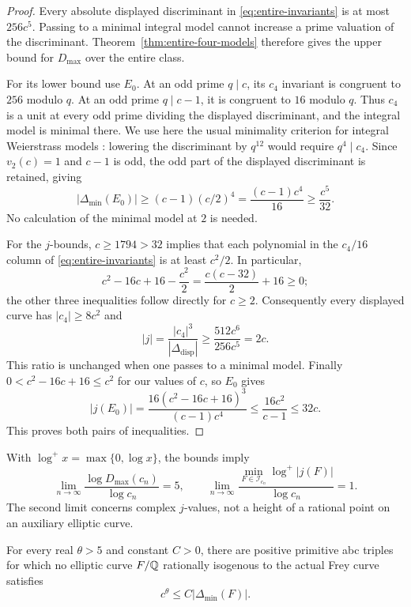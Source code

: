 \begin{proof}
Every absolute displayed discriminant in
\eqref{eq:entire-invariants} is at most $256c^5$. Passing to a minimal
integral model cannot increase a prime valuation of the discriminant.
Theorem~\ref{thm:entire-four-models} therefore gives the upper bound
for $D_{\max}$ over the entire class.

For its lower bound use $E_0$. At an odd prime $q\mid c$, its
$c_4$ invariant is congruent to $256$ modulo $q$. At an odd prime
$q\mid c-1$, it is congruent to $16$ modulo $q$. Thus $c_4$ is a
unit at every odd prime dividing the displayed discriminant, and
the integral model is minimal there. We use here the usual
minimality criterion for integral Weierstrass models
\cite[Chapter~VII]{Silverman}: lowering the discriminant by $q^{12}$
would require $q^4\mid c_4$.
Since $v_2(c)=1$ and $c-1$ is odd, the odd part of the displayed
discriminant is retained, giving
\begin{equation}\label{eq:entire-odd-discriminant}
 |\Delta_{\min}(E_0)|
 \ge(c-1)(c/2)^4
 =\frac{(c-1)c^4}{16}
 \ge\frac{c^5}{32}.
\end{equation}
No calculation of the minimal model at $2$ is needed.

For the $j$-bounds, $c\ge1794>32$ implies that each polynomial in
the $c_4/16$ column of \eqref{eq:entire-invariants} is at least
$c^2/2$. In particular,
\[
 c^2-16c+16-\frac{c^2}{2}
   =\frac{c(c-32)}{2}+16\ge0;
\]
the other three inequalities follow directly for $c\ge2$.
Consequently every displayed curve has $|c_4|\ge8c^2$ and
\[
 |j|=\frac{|c_4|^3}{|\Delta_{\mathrm{disp}}|}
       \ge\frac{512c^6}{256c^5}=2c.
\]
This ratio is unchanged when one passes to a minimal model.
Finally $0<c^2-16c+16\le c^2$ for our values of $c$, so $E_0$ gives
\[
 |j(E_0)|=
 \frac{16(c^2-16c+16)^3}{(c-1)c^4}
 \le\frac{16c^2}{c-1}\le32c.
\]
This proves both pairs of inequalities.
\end{proof}

With $\log^+x=\max\{0,\log x\}$, the bounds imply
\begin{equation}\label{eq:entire-limits}
 \lim_{n\to\infty}
 \frac{\log D_{\max}(c_n)}{\log c_n}=5,\qquad
 \lim_{n\to\infty}
 \frac{\min_{F\in\mathcal I_{c_n}}\log^+|j(F)|}{\log c_n}=1.
\end{equation}
The second limit concerns complex $j$-values, not a height of a
rational point on an auxiliary elliptic curve.

\begin{corollary}\label{cor:entire-sixth-power-obstruction}
For every real $\theta>5$ and constant $C>0$, there are positive
primitive abc triples for which no elliptic curve $F/\mathbb Q$ rationally
isogenous to the actual Frey curve satisfies
\[
 c^\theta\le C|\Delta_{\min}(F)|.
\]
\end{corollary}

